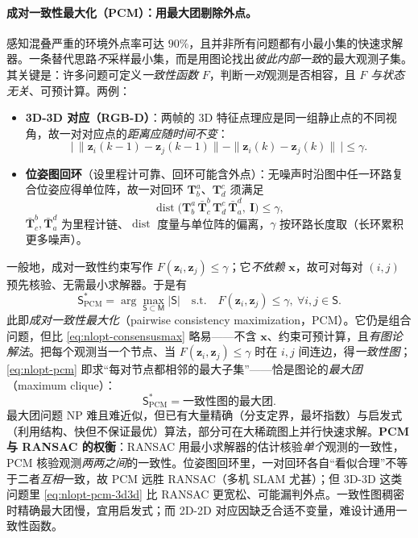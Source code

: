 \paragraph{成对一致性最大化（PCM）：用最大团剔除外点。}\cite{mangelson2018pcm,carlone2026handbook}
感知混叠严重的环境外点率可达 $90\%$，且并非所有问题都有小最小集的快速求解器。一条替代思路\emph{不}采样最小集，而是用图论找出\emph{彼此内部一致}的最大观测子集。其关键是：许多问题可定义\emph{一致性函数} $F$，判断\emph{一对}观测是否相容，且 $F$ \emph{与状态无关}、可预计算。两例：
\begin{itemize}
  \item \textbf{3D-3D 对应（RGB-D）}：两帧的 3D 特征点理应是同一组静止点的不同视角，故一对对应点的\emph{距离应随时间不变}：
  \begin{equation}
    \big|\,\|\mathbf{z}_i(k{-}1)-\mathbf{z}_j(k{-}1)\|-\|\mathbf{z}_i(k)-\mathbf{z}_j(k)\|\,\big|\le\gamma.
    \label{eq:nlopt-pcm-3d3d}
  \end{equation}
  \item \textbf{位姿图回环}（设里程计可靠、回环可能含外点）：无噪声时沿图中任一环路复合位姿应得单位阵，故一对回环 $\mathbf{T}_b^a$、$\mathbf{T}_d^c$ 须满足
  \begin{equation}
    \operatorname{dist}\!\big(\mathbf{T}_b^a\,\bar{\mathbf{T}}_c^b\,\mathbf{T}_d^c\,\bar{\mathbf{T}}_a^d,\ \mathbf{I}\big)\le\gamma,
    \label{eq:nlopt-pcm-loop}
  \end{equation}
  $\bar{\mathbf{T}}_c^b,\bar{\mathbf{T}}_a^d$ 为里程计链、$\operatorname{dist}$ 度量与单位阵的偏离，$\gamma$ 按环路长度取（长环累积更多噪声）。
\end{itemize}
一般地，成对一致性约束写作 $F(\mathbf{z}_i,\mathbf{z}_j)\le\gamma$；它\emph{不依赖} $\mathbf{x}$，故可对每对 $(i,j)$ 预先核验、无需最小求解器。于是有
\begin{equation}
  \mathsf{S}^*_{\mathrm{PCM}}=\arg\max_{\mathsf{S}\subset\mathsf{M}}|\mathsf{S}|
  \quad\text{s.t.}\quad F(\mathbf{z}_i,\mathbf{z}_j)\le\gamma,\ \forall i,j\in\mathsf{S}.
  \label{eq:nlopt-pcm}
\end{equation}
此即\emph{成对一致性最大化}（pairwise consistency maximization，PCM）。它仍是组合问题，但比 \cref{eq:nlopt-consensusmax} 略易——不含 $\mathbf{x}$、约束可预计算，且\emph{有图论解法}。把每个观测当一个节点、当 $F(\mathbf{z}_i,\mathbf{z}_j)\le\gamma$ 时在 $i,j$ 间连边，得\emph{一致性图}；\cref{eq:nlopt-pcm} 即求“每对节点都相邻的最大子集”——恰是图论的\emph{最大团}（maximum clique）：
\begin{equation}
  \mathsf{S}^*_{\mathrm{PCM}}=\text{一致性图的最大团}.
  \label{eq:nlopt-pcm-clique}
\end{equation}
最大团问题 NP 难且难近似，但已有大量精确（分支定界，最坏指数）与启发式（利用结构、快但不保证最优）算法，部分可在大稀疏图上并行快速求解。\textbf{PCM 与 RANSAC 的权衡}：RANSAC 用最小求解器的估计核验\emph{单个}观测的一致性，PCM 核验观测\emph{两两之间}的一致性。位姿图回环里，一对回环各自“看似合理”不等于二者\emph{互相}一致，故 PCM 远胜 RANSAC（多机 SLAM 尤甚）；但 3D-3D 这类问题里 \cref{eq:nlopt-pcm-3d3d} 比 RANSAC 更宽松、可能漏判外点。一致性图稠密时精确最大团慢，宜用启发式；而 2D-2D 对应因缺乏合适不变量，难设计通用一致性函数。

